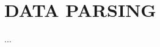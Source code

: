 \documentclass[../report.tex]{subfiles}
\begin{document}
\section{DATA PARSING}

...
\end{document}
